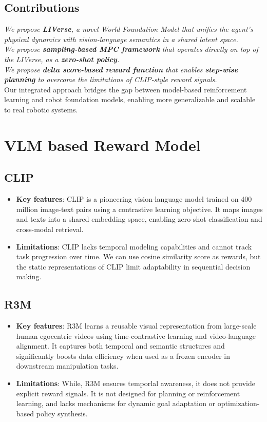 \documentclass[11pt]{article}
\begin{document}
\subsection{Contributions}
\textit{We propose \textbf{LIVerse}, a novel World Foundation Model that unifies the agent's physical dynamics with vision-language semantics in a shared latent space. \\
We propose \textbf{sampling-based MPC framework} that operates directly on top of the LIVerse, as a \textbf{zero-shot policy}. \\
We propose \textbf{delta score-based reward function} that enables \textbf{step-wise planning} to overcome the limitations of CLIP-style reward signals.\\}
Our integrated approach bridges the gap between model-based reinforcement learning and robot foundation models, enabling more generalizable and scalable to real robotic systems.

\section{VLM based Reward Model}

\subsection{CLIP}
\begin{itemize}
    \item \textbf{Key features}: CLIP is a pioneering vision-language model trained on 400 million image-text pairs using a contrastive learning objective. It maps images and texts into a shared embedding space, enabling zero-shot classification and cross-modal retrieval.
    
    \item \textbf{Limitations}: CLIP lacks temporal modeling capabilities and cannot track task progression over time. We can use cosine similarity score as rewards, but the static representations of CLIP limit adaptability in sequential decision making.
\end{itemize}

\subsection{R3M}
\begin{itemize}
    \item \textbf{Key features}: R3M \cite{r3m} learns a reusable visual representation from large-scale human egocentric videos using time-contrastive learning and video-language alignment. It captures both temporal and semantic structures and significantly boosts data efficiency when used as a frozen encoder in downstream manipulation tasks.
    
    \item \textbf{Limitations}: While, R3M ensures temporlal awareness, it does not provide explicit reward signals. It is not designed for planning or reinforcement learning, and lacks mechanisms for dynamic goal adaptation or optimization-based policy synthesis.
\end{itemize}
\end{document}
